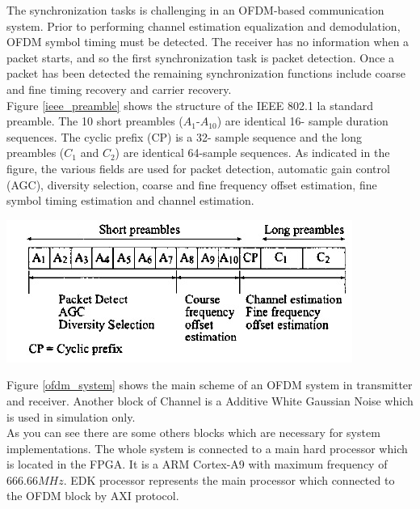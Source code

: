 The synchronization tasks is challenging in an OFDM-based communication system. Prior to performing channel estimation equalization and demodulation, OFDM symbol timing must be detected. The receiver has no information when a packet starts, and so the first synchronization task is packet detection. Once a packet has been detected the remaining synchronization functions include coarse and fine timing recovery and carrier recovery.\\
Figure \ref{ieee_preamble} shows the structure of the IEEE 802.1 la standard preamble. The 10 short preambles ($A_{1}$-$A_{10}$) are identical 16- sample duration sequences. The cyclic prefix (CP) is a 32- sample sequence and the long preambles ($C_{1}$ and $C_{2}$) are identical 64-sample sequences. As indicated in the figure, the various fields are used for packet detection, automatic gain control (AGC), diversity selection, coarse and fine frequency offset estimation, fine symbol timing estimation and channel estimation. 

\begin{center}
\includegraphics[width=\textwidth]{content/fig/ieee_preamble.JPG}
\label{ieee_preamble}
\end{center}


Figure \ref{ofdm_system} shows the main scheme of an OFDM system in transmitter and receiver. Another block of Channel is a Additive White Gaussian Noise which is used in simulation only.\\
As you can see there are some others blocks which are necessary for system implementations. The whole system is connected to a main hard processor which is located in the FPGA. It is a ARM Cortex-A9 with maximum frequency of $666.66 MHz$. EDK processor represents the main processor which connected to the OFDM block by AXI protocol. 


